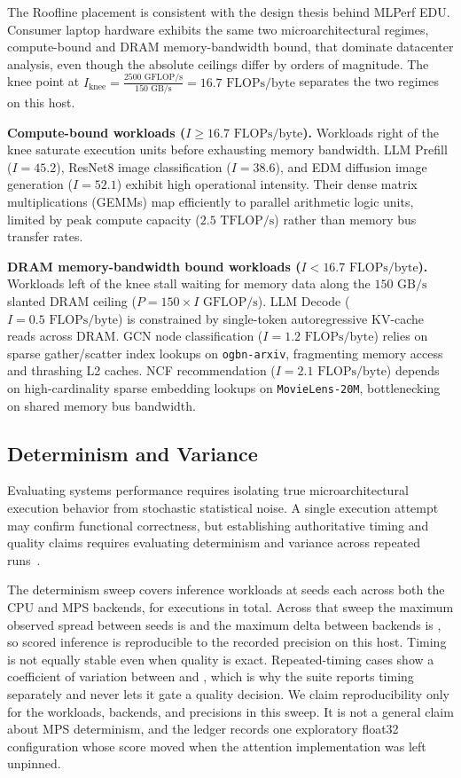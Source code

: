 \documentclass[10pt,twocolumn]{article}
\begin{document}
The Roofline placement is consistent with the design thesis behind MLPerf EDU. Consumer laptop hardware exhibits the same two microarchitectural regimes, compute-bound and DRAM memory-bandwidth bound, that dominate datacenter analysis, even though the absolute ceilings differ by orders of magnitude. The knee point at $I_{\text{knee}} = \frac{2500\text{ GFLOP/s}}{150\text{ GB/s}} = 16.7\text{ FLOPs/byte}$ separates the two regimes on this host.

\textbf{Compute-bound workloads ($I \ge 16.7\text{ FLOPs/byte}$).} Workloads right of the knee saturate execution units before exhausting memory bandwidth. LLM Prefill ($I=45.2$), ResNet8 image classification ($I=38.6$), and EDM diffusion image generation ($I=52.1$) exhibit high operational intensity. Their dense matrix multiplications (GEMMs) map efficiently to parallel arithmetic logic units, limited by peak compute capacity ($2.5\text{ TFLOP/s}$) rather than memory bus transfer rates.

\textbf{DRAM memory-bandwidth bound workloads ($I < 16.7\text{ FLOPs/byte}$).} Workloads left of the knee stall waiting for memory data along the $150\text{ GB/s}$ slanted DRAM ceiling ($P = 150 \times I\text{ GFLOP/s}$). LLM Decode ($I=0.5\text{ FLOPs/byte}$) is constrained by single-token autoregressive KV-cache reads across DRAM. GCN node classification ($I=1.2\text{ FLOPs/byte}$) relies on sparse gather/scatter index lookups on \texttt{ogbn-arxiv}, fragmenting memory access and thrashing L2 caches. NCF recommendation ($I=2.1\text{ FLOPs/byte}$) depends on high-cardinality sparse embedding lookups on \texttt{MovieLens-20M}, bottlenecking on shared memory bus bandwidth.

\subsection{Determinism and Variance}
\label{sec:determinism}
Evaluating systems performance requires isolating true microarchitectural execution behavior from stochastic statistical noise. A single execution attempt may confirm functional correctness, but establishing authoritative timing and quality claims requires evaluating determinism and variance across repeated runs~\citep{bouthillier2019,pham2020}.

The determinism sweep covers \DeterminismWorkloads{} inference workloads at \DeterminismSeeds{} seeds each across both the CPU and MPS backends, for \DeterminismExecutions{} executions in total. Across that sweep the maximum observed spread between seeds is \DeterminismMaxSeedSpread{} and the maximum delta between backends is \DeterminismMaxBackendDelta{}, so scored inference is reproducible to the recorded precision on this host. Timing is not equally stable even when quality is exact. Repeated-timing cases show a coefficient of variation between \FiveRunMinCV{} and \FiveRunMaxCV{}, which is why the suite reports timing separately and never lets it gate a quality decision. We claim reproducibility only for the workloads, backends, and precisions in this sweep. It is not a general claim about MPS determinism, and the ledger records one exploratory float32 configuration whose score moved when the attention implementation was left unpinned.
\end{document}
